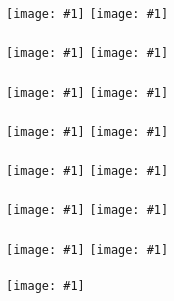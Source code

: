 \documentclass[a4j]{jarticle}
\newcommand{\graph}[1]{\texttt{[image: \#1]}}
\begin{document}
\graph{bm_app_fib_total_time.png}
\graph{bm_app_tak_total_time.png}\\\\
\graph{bm_app_tarai_total_time.png}
\graph{bm_fannkuch_total_time.png}\\\\
\graph{bm_fractal_total_time.png}
\graph{bm_mergesort_hongli_total_time.png}\\\\
\graph{bm_partial_sums_total_time.png}
\graph{bm_so_lists_large_heap_total_time.png}\\\\
\graph{bm_so_lists_small_heap_total_time.png}
\graph{bm_so_matrix_large_heap_total_time.png}\\\\
\graph{bm_so_matrix_small_heap_total_time.png}
\graph{bm_so_object_total_time.png}\\\\
\graph{bm_spectral_norm_total_time.png}
\graph{string_concat_large_heap_total_time.png}\\\\
\graph{string_concat_small_heap_total_time.png}
\end{document}
